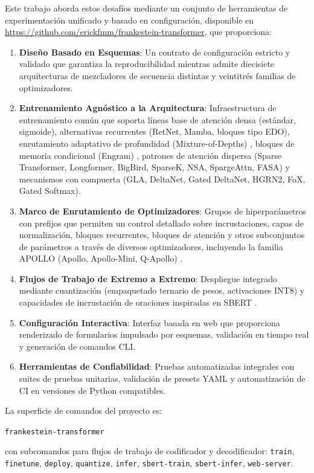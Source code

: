 \documentclass[11pt,a4paper]{article}
\begin{document}
Este trabajo aborda estos desafíos mediante un conjunto de herramientas de experimentación unificado y basado en configuración, disponible en \url{https://github.com/erickfmm/frankestein-transformer}, que proporciona:
\begin{enumerate}[leftmargin=*]
    \item \textbf{Diseño Basado en Esquemas}: Un contrato de configuración estricto y validado que garantiza la reproducibilidad mientras admite diecisiete arquitecturas de mezcladores de secuencia distintas y veintitrés familias de optimizadores.
    \item \textbf{Entrenamiento Agnóstico a la Arquitectura}: Infraestructura de entrenamiento común que soporta líneas base de atención densa (estándar, sigmoide), alternativas recurrentes (RetNet, Mamba, bloques tipo EDO), enrutamiento adaptativo de profundidad (Mixture-of-Depths) \citep{zhu2026mixtureofdepthsattention}, bloques de memoria condicional (Engram) \citep{cheng2026conditionalmemoryscalablelookup}, patrones de atención dispersa (Sparse Transformer, Longformer, BigBird, SparseK, NSA, SpargeAttn, FASA) y mecanismos con compuerta (GLA, DeltaNet, Gated DeltaNet, HGRN2, FoX, Gated Softmax).
    \item \textbf{Marco de Enrutamiento de Optimizadores}: Grupos de hiperparámetros con prefijos que permiten un control detallado sobre incrustaciones, capas de normalización, bloques recurrentes, bloques de atención y otros subconjuntos de parámetros a través de diversos optimizadores, incluyendo la familia APOLLO (Apollo, Apollo-Mini, Q-Apollo) \citep{zhu2025apollosgdlikememoryadamwlevel}.
    \item \textbf{Flujos de Trabajo de Extremo a Extremo}: Despliegue integrado mediante cuantización (empaquetado ternario de pesos, activaciones INT8) y capacidades de incrustación de oraciones inspiradas en SBERT \citep{reimers_sentence-bert_2019}.
    \item \textbf{Configuración Interactiva}: Interfaz basada en web que proporciona renderizado de formularios impulsado por esquemas, validación en tiempo real y generación de comandos CLI.
    \item \textbf{Herramientas de Confiabilidad}: Pruebas automatizadas integrales con suites de pruebas unitarias, validación de presets YAML y automatización de CI en versiones de Python compatibles.
\end{enumerate}

La superficie de comandos del proyecto es:
\begin{center}
\texttt{frankestein-transformer}
\end{center}
con subcomandos para flujos de trabajo de codificador y decodificador:
\texttt{train}, \texttt{finetune}, \texttt{deploy}, \texttt{quantize}, \texttt{infer}, \texttt{sbert-train}, \texttt{sbert-infer}, \texttt{web-server}.
\end{document}
